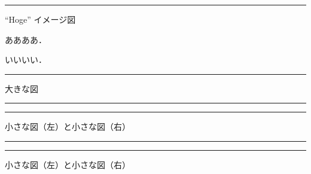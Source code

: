 \documentclass[9pt,a4paper]{ltjsarticle}                %
\begin{document}
\begin{multicols}{2}

\begin{Figure}
    \centering
    \iffigure
    \rule{50mm}{30mm}
    \fi
    \captionsetup{type=figure}
    \caption{``Hoge'' イメージ図}
\end{Figure}



ああああ．


いいいい．


\begin{Figure}
    \centering
    \iffigure
    \rule{50mm}{30mm}
    \fi
    \captionsetup{type=figure}
    \caption{大きな図}
\end{Figure}
\begin{Figure}
    \begin{minipage}{0.49\hsize}
        \centering
        \iffigure
        \rule{35mm}{30mm}
        \fi
    \end{minipage}
    \begin{minipage}{0.49\hsize}
        \centering
        \iffigure
        \rule{35mm}{30mm}
        \fi
    \end{minipage}
    \captionsetup{type=figure}
    \caption{小さな図（左）と小さな図（右）}
\end{Figure}
\begin{Figure}
    \begin{minipage}{0.49\hsize}
        \centering
        \iffigure
        \rule{35mm}{30mm}
        \fi
    \end{minipage}
    \begin{minipage}{0.49\hsize}
        \centering
        \iffigure
        \rule{35mm}{30mm}
        \fi
    \end{minipage}
    \captionsetup{type=figure}
    \caption{小さな図（左）と小さな図（右）}
\end{Figure}



\end{multicols}
\end{document}
